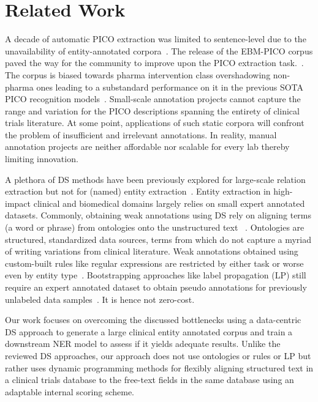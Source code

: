 \documentclass[11pt]{article}
\begin{document}
\section{Related Work}
\label{sec:relworks}
%
A decade of automatic PICO extraction was limited to sentence-level due to the unavailability of entity-annotated corpora~\citep{boudin2010combining, huang2011classification, huang2013pico, wallace2016extracting, jin2018pico}.
The release of the EBM-PICO corpus paved the way for the community to improve upon the PICO extraction task.~\citep{nye2018corpus}.
The corpus is biased towards pharma intervention class overshadowing non-pharma ones leading to a substandard performance on it in the previous SOTA PICO recognition models~\citep{beltagy2019scibert,brockmeier2019improving,zhang2020unlocking,liu2021sent2span}.
Small-scale annotation projects cannot capture the range and variation for the PICO descriptions spanning the entirety of clinical trials literature.
At some point, applications of such static corpora will confront the problem of insufficient and irrelevant annotations.
In reality, manual annotation projects are neither affordable nor scalable for every lab thereby limiting innovation.

A plethora of DS methods have been previously explored for large-scale relation extraction but not for (named) entity extraction~\cite{etzioni2008open,smirnova2018relation,adelani2020distant}.
Entity extraction in high-impact clinical and biomedical domains largely relies on small expert annotated datasets.
Commonly, obtaining weak annotations using DS rely on aligning terms (a word or phrase) from ontologies onto the unstructured text ~\citep{giannakopoulos2017unsupervised,yang2018distantly,peng2019distantly,hedderich2021anea}.
Ontologies are structured, standardized data sources, terms from which do not capture a myriad of writing variations from clinical literature.
Weak annotations obtained using custom-built rules like regular expressions are restricted by either task or worse even by entity type~\cite{ratner2017snorkel,safranchik2020weakly,fries2021ontology}.
Bootstrapping approaches like label propagation (LP) still require an expert annotated dataset to obtain pseudo annotations for previously unlabeled data samples~\cite{bing2017bootstrapping}.
It is hence not zero-cost.

Our work focuses on overcoming the discussed bottlenecks using a data-centric DS approach to generate a large clinical entity annotated corpus and train a downstream NER model to assess if it yields adequate results.
Unlike the reviewed DS approaches, our approach does not use ontologies or rules or LP but rather uses dynamic programming methods for flexibly aligning structured text in a clinical trials database to the free-text fields in the same database using an adaptable internal scoring scheme.
%
%
%
\end{document}
